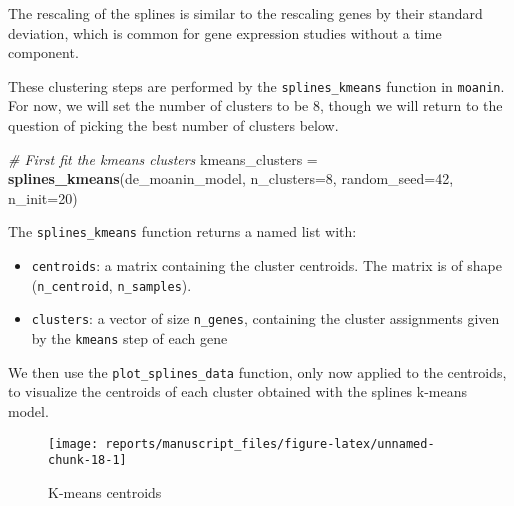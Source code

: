 \documentclass[9pt,a4paper,]{extarticle}
\newenvironment{Shaded}{\begin{snugshade}}{\end{snugshade}}
\newcommand{\CommentTok}[1]{\textcolor[rgb]{0.56,0.35,0.01}{\textit{#1}}}
\newcommand{\DataTypeTok}[1]{\textcolor[rgb]{0.13,0.29,0.53}{#1}}
\newcommand{\DecValTok}[1]{\textcolor[rgb]{0.00,0.00,0.81}{#1}}
\newcommand{\KeywordTok}[1]{\textcolor[rgb]{0.13,0.29,0.53}{\textbf{#1}}}
\newcommand{\NormalTok}[1]{#1}
\newcommand{\OperatorTok}[1]{\textcolor[rgb]{0.81,0.36,0.00}{\textbf{#1}}}
\newcommand{\OtherTok}[1]{\textcolor[rgb]{0.56,0.35,0.01}{#1}}
\newcommand{\StringTok}[1]{\textcolor[rgb]{0.31,0.60,0.02}{#1}}
\begin{document}
The rescaling of the splines is similar to the rescaling genes by their standard deviation, which is common for gene expression studies without a time component.

These clustering steps are performed by the \texttt{splines\_kmeans}
function in \texttt{moanin}. For now, we will set the number of clusters to be \(8\), though we
will return to the question of picking the best number of clusters below.

\begin{Shaded}
\begin{Highlighting}[]
\CommentTok{# First fit the kmeans clusters}
\NormalTok{kmeans_clusters =}\StringTok{ }\KeywordTok{splines_kmeans}\NormalTok{(de_moanin_model, }\DataTypeTok{n_clusters=}\DecValTok{8}\NormalTok{,}
    \DataTypeTok{random_seed=}\DecValTok{42}\NormalTok{,}
    \DataTypeTok{n_init=}\DecValTok{20}\NormalTok{)}
\end{Highlighting}
\end{Shaded}

The \texttt{splines\_kmeans} function returns a named list with:

\begin{itemize}
\tightlist
\item
  \texttt{centroids}: a matrix containing the cluster centroids. The matrix is of
  shape (\texttt{n\_centroid}, \texttt{n\_samples}).
\item
  \texttt{clusters}: a vector of size \texttt{n\_genes}, containing the cluster assignments given by the \texttt{kmeans} step of each gene
\end{itemize}

We then use the \texttt{plot\_splines\_data} function, only now applied to the centroids, to visualize the centroids of
each cluster obtained with the splines k-means model.

\begin{Shaded}
\end{Shaded}

\begin{figure}[H]

{\centering \texttt{[image: reports/manuscript\_files/figure-latex/unnamed-chunk-18-1]} 

}

\caption{K-means centroids}\label{fig:unnamed-chunk-18}
\end{figure}
\end{document}
